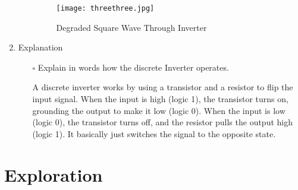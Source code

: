 \documentclass[12pt]{article}
\begin{document}
\begin{enumerate}
\begin{itemize}
\begin{figure}[h]
    \centering
    \texttt{[image: threethree.jpg]}
    \caption{Degraded Square Wave Through Inverter}
    \label{fig:Degraded-Square-Wave-Inverter}
\end{figure}

    
\end{itemize}
\item Explanation
\begin{itemize}
    \item[$\square$] Explain in words how the discrete Inverter operates.

    A discrete inverter works by using a transistor and a resistor to flip the input signal. When the input is high (logic 1), the transistor turns on, grounding the output to make it low (logic 0). When the input is low (logic 0), the transistor turns off, and the resistor pulls the output high (logic 1). It basically just switches the signal to the opposite state.
    
\end{itemize}
\end{enumerate}

\clearpage
\section{Exploration}
\end{document}
